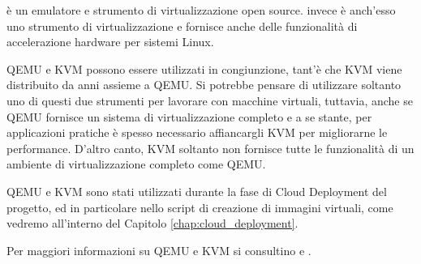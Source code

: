              è un emulatore e strumento di virtualizzazione open source.  invece è anch'esso uno strumento di virtualizzazione e fornisce anche delle funzionalità di accelerazione hardware per sistemi Linux.
            
            \ac{QEMU} e \ac{KVM} possono essere utilizzati in congiunzione, tant'è che \ac{KVM} viene distribuito da anni assieme a \ac{QEMU}. Si potrebbe pensare di utilizzare soltanto uno di questi due strumenti per lavorare con macchine virtuali, tuttavia, anche se \ac{QEMU} fornisce un sistema di virtualizzazione completo e a se stante, per applicazioni pratiche è spesso necessario affiancargli \ac{KVM} per migliorarne le performance. D'altro canto, \ac{KVM} soltanto non fornisce tutte le funzionalità di un ambiente di virtualizzazione completo come \ac{QEMU}.
            
            \ac{QEMU} e \ac{KVM} sono stati utilizzati durante la fase di Cloud Deployment del progetto, ed in particolare nello script di creazione di immagini virtuali, come vedremo all'interno del Capitolo \ref{chap:cloud_deployment}.
            
            Per maggiori informazioni su \ac{QEMU} e \ac{KVM} si consultino \cite{kvm:wiki} e \cite{qemu:wiki}.
